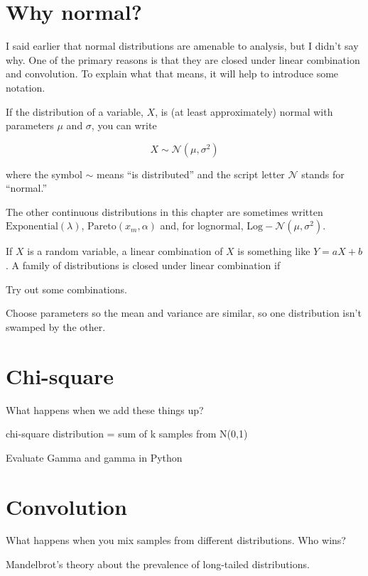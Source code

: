 \documentclass[12pt]{book}
\begin{document}
\section{Why normal?}

I said earlier that normal distributions are amenable to analysis,
but I didn't say why.  One of the primary reasons is that they are
closed under linear combination and convolution.  To explain what
that means, it will help to introduce some notation.

If the distribution of a variable, $X$, is (at least approximately)
normal with parameters $\mu$ and $\sigma$, you can write

\[ X \sim \mathcal{N} (\mu, \sigma^2) \]

where the symbol $\sim$ means ``is distributed'' and the script letter
$\mathcal{N}$ stands for ``normal.''

The other continuous distributions in this chapter are sometimes
written $\mathrm{Exponential}(\lambda)$, $\mathrm{Pareto}(x_m,
\alpha)$ and, for lognormal, $\mathrm{Log}-\mathcal{N} (\mu,
\sigma^2)$.

If $X$ is a random variable, a linear combination of $X$ is something
like $Y = aX + b$.  
A family of distributions is closed under linear combination if


\begin{ex}

Try out some combinations.

Choose parameters so the mean and variance are similar, so one
distribution isn't swamped by the other.

\end{ex}


\section{Chi-square}

What happens when we add these things up?

chi-square distribution = sum of k samples from N(0,1)

Evaluate Gamma and gamma in Python


\section{Convolution}

What happens when you mix samples from different distributions.  Who wins?

Mandelbrot's theory about the prevalence of long-tailed distributions.
\end{document}
